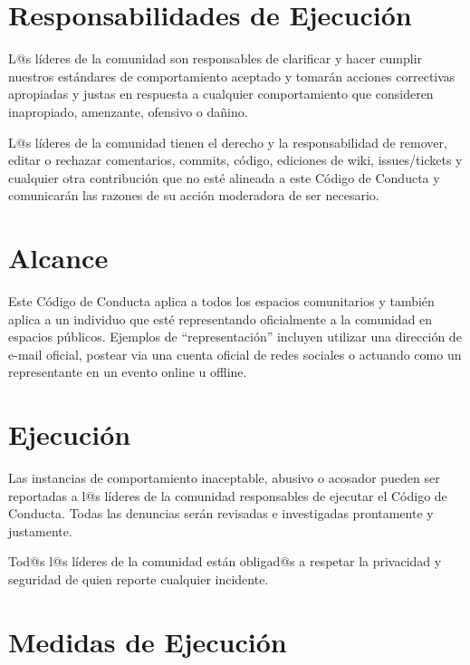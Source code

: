 \documentclass[
]{book}
\begin{document}
\hypertarget{responsabilidades-de-ejecuciuxf3n}{%
\section{Responsabilidades de Ejecución}\label{responsabilidades-de-ejecuciuxf3n}}

L@s líderes de la comunidad son responsables de clarificar y hacer cumplir nuestros estándares de comportamiento aceptado y tomarán acciones correctivas apropiadas y justas en respuesta a cualquier comportamiento que consideren inapropiado, amenzante, ofensivo o dañino.

L@s líderes de la comunidad tienen el derecho y la responsabilidad de remover, editar o rechazar comentarios, commits, código, ediciones de wiki, issues/tickets y cualquier otra contribución que no esté alineada a este Código de Conducta y comunicarán las razones de su acción moderadora de ser necesario.

\hypertarget{alcance}{%
\section{Alcance}\label{alcance}}

Este Código de Conducta aplica a todos los espacios comunitarios y también aplica a un individuo que esté representando oficialmente a la comunidad en espacios públicos. Ejemplos de ``representación'' incluyen utilizar una dirección de e-mail oficial, postear via una cuenta oficial de redes sociales o actuando como un representante en un evento online u offline.

\hypertarget{ejecuciuxf3n}{%
\section{Ejecución}\label{ejecuciuxf3n}}

Las instancias de comportamiento inaceptable, abusivo o acosador pueden ser reportadas a l@s líderes de la comunidad responsables de ejecutar el Código de Conducta. Todas las denuncias serán revisadas e investigadas prontamente y justamente.

Tod@s l@s líderes de la comunidad están obligad@s a respetar la privacidad y seguridad de quien reporte cualquier incidente.

\hypertarget{medidas-de-ejecuciuxf3n}{%
\section{Medidas de Ejecución}\label{medidas-de-ejecuciuxf3n}}
\end{document}
